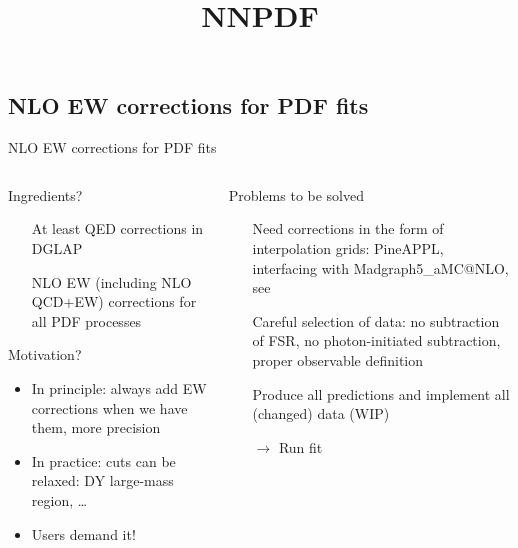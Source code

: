 \title{NNPDF}
\author[Christopher Schwan]{}

\subsection{NLO EW corrections for PDF fits}

\begin{frame}{NLO EW corrections for PDF fits}
\fontsize{9}{11}\selectfont
\begin{columns}[onlytextwidth]
\begin{column}{0.45\textwidth}

\begin{block}{Ingredients?}
\begin{itemize}
\item[\ding{51}] At least QED corrections in DGLAP
\item[\ding{55}] NLO EW (including NLO QCD+EW) corrections for all PDF processes
\end{itemize}
\end{block}

\vspace*{0.5cm}

\begin{block}{Motivation?}
\begin{itemize}
\item In principle: always add EW corrections when we have them, more precision
\item In practice: cuts can be relaxed: DY large-mass region, \ldots
\item Users demand it!
\end{itemize}
\end{block}
\end{column}
\begin{column}{0.45\textwidth}
\begin{block}{Problems to be solved}
\begin{itemize}
\item[\ding{51}] Need corrections in the form of \alert{interpolation grids}: PineAPPL, interfacing with Madgraph5\_aMC@NLO, see\\
\item[\ding{51}] Careful selection of data: no subtraction of FSR, no photon-initiated subtraction, proper observable definition
\item[\ding{55}] Produce all predictions and implement all (changed) data (WIP)
\item[$\rightarrow$] Run fit
\end{itemize}
\end{block}
\end{column}
\end{columns}
\end{frame}

